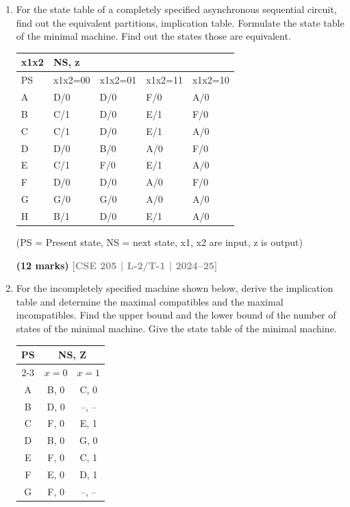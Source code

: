 \documentclass[12pt,a3paper]{article}
\newcommand{\yr}[1]{\hfill\textcolor{gray}{\small\textbf{[#1]}}}
\newcommand{\mk}[1]{\textcolor{orange!70!black}{\small\textbf{(#1 marks)}}}
\begin{document}
\begin{enumerate}

\item For the state table of a completely specified asynchronous sequential circuit, find out the equivalent partitions, implication table. Formulate the state table of the minimal machine. Find out the states those are equivalent.

\begin{center}
  \begin{tabular}{|l|l|l|l|l|}
\hline
x1x2 & NS, z & & & \\ \hline
PS & x1x2=00 & x1x2=01 & x1x2=11 & x1x2=10 \\ \hline
A & D/0 & D/0 & F/0 & A/0 \\ \hline
B & C/1 & D/0 & E/1 & F/0 \\ \hline
C & C/1 & D/0 & E/1 & A/0 \\ \hline
D & D/0 & B/0 & A/0 & F/0 \\ \hline
E & C/1 & F/0 & E/1 & A/0 \\ \hline
F & D/0 & D/0 & A/0 & F/0 \\ \hline
G & G/0 & G/0 & A/0 & A/0 \\ \hline
H & B/1 & D/0 & E/1 & A/0 \\ \hline
\end{tabular}

\vspace{0.3cm}
(PS = Present state, NS = next state, x1, x2 are input, z is output)
\end{center}

\mk{12} \yr{CSE 205 | L-2/T-1 | 2024--25}

\item For the incompletely specified machine shown below, derive the implication table and determine the maximal compatibles and the maximal incompatibles. Find the upper bound and the lower bound of the number of states of the minimal machine. Give the state table of the minimal machine.

\begin{center}
\begin{tabular}{|c|c|c|}
\hline
\multirow{2}{*}{PS} & \multicolumn{2}{c|}{NS, Z} \\ \cline{2-3}
 & $x=0$ & $x=1$ \\ \hline
A & B, 0 & C, 0 \\ \hline
B & D, 0 & --, -- \\ \hline
C & F, 0 & E, 1 \\ \hline
D & B, 0 & G, 0 \\ \hline
E & F, 0 & C, 1 \\ \hline
F & E, 0 & D, 1 \\ \hline
G & F, 0 & --, -- \\ \hline
\end{tabular}
\end{center}


\end{enumerate}
\end{document}
